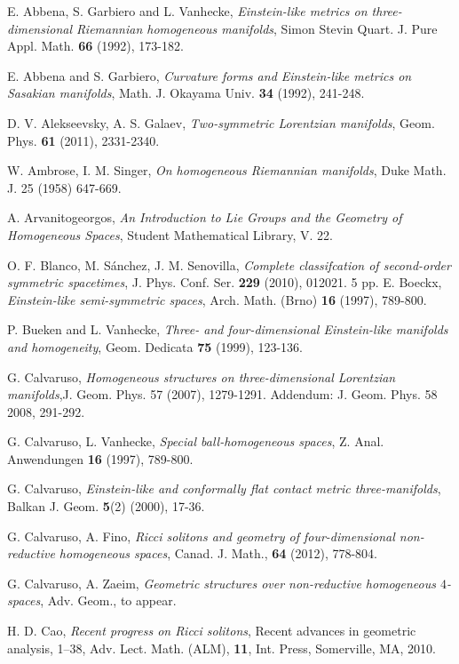\documentclass[11pt,oneside,leqno]{amsart}
\theoremstyle{plain}
\begin{document}
\begin{thebibliography}{99}
E. Abbena, S. Garbiero and L. Vanhecke, {\em Einstein-like metrics on three-dimensional Riemannian homogeneous
manifolds}, Simon Stevin Quart. J. Pure Appl. Math. {\bf 66} (1992), 173-182.

E. Abbena and S. Garbiero, {\em Curvature forms and Einstein-like metrics on Sasakian manifolds}, Math. J.
Okayama Univ. {\bf 34} (1992), 241-248.

D. V. Alekseevsky, A. S. Galaev, {\em Two-symmetric Lorentzian manifolds}, Geom. Phys. {\bf 61} (2011), 2331-2340.

W. Ambrose, I. M. Singer, {\em On homogeneous Riemannian manifolds}, Duke Math. J. 25 (1958) 647-669.

A. Arvanitogeorgos, {\em An Introduction to Lie Groups and the Geometry of Homogeneous Spaces}, Student Mathematical Library, V. 22.

O. F. Blanco, M. S\'anchez, J. M. Senovilla, {\em Complete classifcation of second-order symmetric spacetimes}, J. Phys. Conf. Ser. {\bf 229} (2010), 012021. 5 pp.
E. Boeckx, {\em Einstein-like semi-symmetric spaces}, Arch. Math. (Brno) {\bf 16} (1997), 789-800.

P. Bueken and L. Vanhecke, {\em Three- and four-dimensional Einstein-like manifolds and homogeneity}, Geom. Dedicata {\bf 75} (1999), 123-136.

 G. Calvaruso, {\em Homogeneous structures on three-dimensional Lorentzian manifolds},J. Geom. Phys. 57 (2007), 1279-1291. Addendum: J. Geom. Phys. 58 2008, 291-292.

G. Calvaruso, L. Vanhecke, {\em Special ball-homogeneous spaces}, Z. Anal. Anwendungen {\bf 16} (1997), 789-800.

G. Calvaruso, {\em Einstein-like and conformally flat contact metric three-manifolds}, Balkan J. Geom. {\bf 5}(2) (2000), 17-36.

G. Calvaruso, A. Fino, {\em Ricci solitons and geometry of four-dimensional non-reductive homogeneous spaces}, Canad. J. Math., {\bf 64} (2012), 778-804.

G. Calvaruso, A. Zaeim, {\em Geometric structures over non-reductive homogeneous $4$-spaces}, Adv. Geom., to appear.

H. D. Cao, {\em Recent progress on Ricci solitons}, Recent advances in geometric analysis, 1--38,  Adv. Lect. Math. (ALM), {\bf 11}, Int. Press, Somerville, MA, 2010.


\end{thebibliography}
\end{document}
